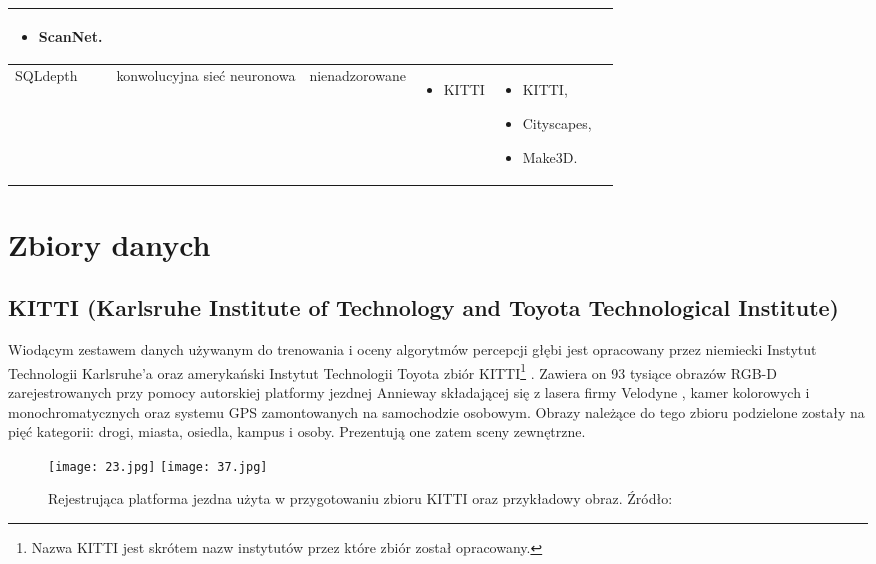 \begin{table}[H]
{\begin{tabular}{ |l|p{2cm}|p{3cm}|p{5cm}|p{5cm}|r| }
\begin{itemize}
            \item ScanNet.
        \end{itemize}\\
        \hline
        SQLdepth &
        konwolucyjna sieć neuronowa &
        nienadzorowane &
        \begin{itemize}
            \item KITTI
        \end{itemize} & 
        \begin{itemize}
            \item KITTI,
            \item Cityscapes,
            \item Make3D.
        \end{itemize}\\
        \hline
        \end{tabular}%
    }
    \label{tabela_podsumowanie_algorytmy_2}
\end{table}

\section{Zbiory danych}
\subsection{KITTI (Karlsruhe Institute of Technology and Toyota Technological Institute)}
Wiodącym zestawem danych używanym do trenowania i oceny algorytmów percepcji głębi jest opracowany przez niemiecki Instytut Technologii Karlsruhe'a oraz amerykański Instytut Technologii Toyota zbiór KITTI\footnote{Nazwa KITTI jest skrótem nazw instytutów przez które zbiór został opracowany.} \cite{geiger2012}. Zawiera on 93 tysiące obrazów RGB-D zarejestrowanych przy pomocy autorskiej platformy jezdnej Annieway składającej się z lasera firmy Velodyne \cite{Velodyne}, kamer kolorowych i monochromatycznych oraz systemu GPS zamontowanych na samochodzie osobowym. Obrazy należące do tego zbioru podzielone zostały na pięć kategorii: drogi, miasta, osiedla, kampus i osoby. Prezentują one zatem sceny zewnętrzne.
\begin{figure}[H]
    \centering
    \texttt{[image: 23.jpg]}
    \texttt{[image: 37.jpg]}
    \caption{Rejestrująca platforma jezdna użyta w przygotowaniu zbioru KITTI oraz przykładowy obraz. Źródło: \cite{geiger2012}}
    \label{fig:kitti-annieway-example}
\end{figure}
